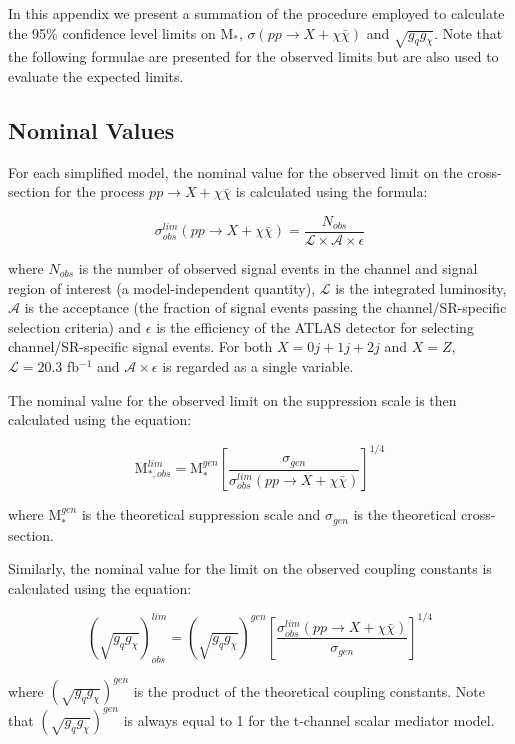 \begin{flushleft}
In this appendix we present a summation of the procedure employed to calculate the 95\% confidence level limits on M$_{*}$, $\sigma(pp \rightarrow X + \chi\bar{\chi})$ and $\sqrt{g_{q}g_{\chi}}$. Note that the following formulae are presented for the observed limits but are also used to evaluate the expected limits.
\end{flushleft}

\subsection{Nominal Values}
\begin{flushleft}
For each simplified model, the nominal value for the observed limit on the cross-section for the process $pp \rightarrow X + \chi\bar{\chi}$ is calculated using the formula:

\begin{equation}
\label{sigma_nom}
\sigma_{obs}^{lim}(pp \rightarrow X + \chi\bar{\chi}) = \frac{N_{obs}}{\mathcal{L}\times\mathcal{A}\times\epsilon}
\end{equation}

where $N_{obs}$ is the number of observed signal events in the channel and signal region of interest (a model-independent quantity), $\mathcal{L}$ is the integrated luminosity, $\mathcal{A}$ is the acceptance (the fraction of signal events passing the channel/SR-specific selection criteria) and $\epsilon$ is the efficiency of the ATLAS detector for selecting channel/SR-specific signal events. For both $X=0j +1j + 2j$ and $X=Z$, $\mathcal{L}=20.3$ fb$^{-1}$ and $\mathcal{A}\times\epsilon$ is regarded as a single variable.
\bigskip

The nominal value for the observed limit on the suppression scale is then calculated using the equation:

\begin{equation}
\label{M_*_nom}
\mbox{M}_{*, obs}^{lim} = \mbox{M}_{*}^{gen}\left[\frac{\sigma_{gen}}{\sigma_{obs}^{lim}(pp \rightarrow X + \chi\bar{\chi})}\right]^{1/4}
\end{equation}

where M$_{*}^{gen}$ is the theoretical suppression scale and $\sigma_{gen}$ is the theoretical cross-section.
\bigskip

Similarly, the nominal value for the limit on the observed coupling constants is calculated using the equation:

\begin{equation}
\label{coupling_nom}
(\sqrt{g_{q}g_{\chi}})_{obs}^{lim} = (\sqrt{g_{q}g_{\chi}})^{gen}\left[\frac{\sigma_{obs}^{lim}(pp \rightarrow X + \chi\bar{\chi})}{\sigma_{gen}}\right]^{1/4}
\end{equation}

where $(\sqrt{g_{q}g_{\chi}})^{gen}$ is the product of the theoretical coupling constants. Note that $(\sqrt{g_{q}g_{\chi}})^{gen}$ is always equal to 1 for the t-channel scalar mediator model. 
\end{flushleft}


